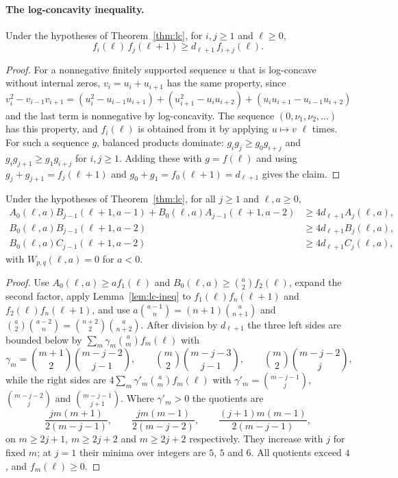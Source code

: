 \paragraph{The log-concavity inequality.}
\begin{lemma}\label{lem:lc-ineq}
Under the hypotheses of Theorem~\ref{thm:lc}, for $i,j\geq1$ and $\ell\geq0$,
\[
f_i(\ell)\,f_j(\ell+1)\geq d_{\ell+1}\,f_{i+j}(\ell).
\]
\end{lemma}
\begin{proof}
For a nonnegative finitely supported sequence $u$ that is log-concave without internal zeros, $v_i=u_i+u_{i+1}$ has the same property, since
$v_i^2-v_{i-1}v_{i+1}=(u_i^2-u_{i-1}u_{i+1})+(u_{i+1}^2-u_iu_{i+2})+(u_iu_{i+1}-u_{i-1}u_{i+2})$
and the last term is nonnegative by log-concavity. The sequence $(0,\nu_1,\nu_2,\ldots)$ has this property, and $f_i(\ell)$ is obtained from it by applying $u\mapsto v$ $\ell$ times. For such a sequence $g$, balanced products dominate: $g_ig_j\geq g_0g_{i+j}$ and $g_ig_{j+1}\geq g_1g_{i+j}$ for $i,j\geq1$. Adding these with $g=f(\ell)$ and using $g_j+g_{j+1}=f_j(\ell+1)$ and $g_0+g_1=f_0(\ell+1)=d_{\ell+1}$ gives the claim.
\end{proof}

\begin{lemma}\label{lem:detours}
Under the hypotheses of Theorem~\ref{thm:lc}, for all $j\geq1$ and $\ell,a\geq0$,
\[
\begin{aligned}
A_0(\ell,a)B_{j-1}(\ell+1,a-1)+B_0(\ell,a)A_{j-1}(\ell+1,a-2)&\geq4d_{\ell+1}A_j(\ell,a),\\
B_0(\ell,a)B_{j-1}(\ell+1,a-2)&\geq4d_{\ell+1}B_j(\ell,a),\\
B_0(\ell,a)C_{j-1}(\ell+1,a-2)&\geq4d_{\ell+1}C_j(\ell,a),
\end{aligned}
\]
with $W_{p,q}(\ell,a)=0$ for $a<0$.
\end{lemma}
\begin{proof}
Use $A_0(\ell,a)\geq af_1(\ell)$ and $B_0(\ell,a)\geq\binom a2f_2(\ell)$, expand the second factor, apply Lemma~\ref{lem:lc-ineq} to $f_1(\ell)f_n(\ell+1)$ and $f_2(\ell)f_n(\ell+1)$, and use $a\binom{a-1}n=(n+1)\binom a{n+1}$ and $\binom a2\binom{a-2}n=\binom{n+2}2\binom a{n+2}$. After division by $d_{\ell+1}$ the three left sides are bounded below by $\sum_m\gamma_m\binom amf_m(\ell)$ with
\[
\gamma_m=\binom{m+1}2\binom{m-j-2}{j-1},\qquad\binom m2\binom{m-j-3}{j-1},\qquad\binom m2\binom{m-j-2}j,
\]
while the right sides are $4\sum_m\gamma'_m\binom amf_m(\ell)$ with $\gamma'_m=\binom{m-j-1}j$, $\binom{m-j-2}j$ and $\binom{m-j-1}{j+1}$. Where $\gamma'_m>0$ the quotients are
\[
\frac{jm(m+1)}{2(m-j-1)},\qquad\frac{jm(m-1)}{2(m-j-2)},\qquad\frac{(j+1)m(m-1)}{2(m-j-1)},
\]
on $m\geq2j+1$, $m\geq2j+2$ and $m\geq2j+2$ respectively. They increase with $j$ for fixed $m$; at $j=1$ their minima over integers are $5$, $5$ and $6$. All quotients exceed $4$, and $f_m(\ell)\geq0$.
\end{proof}

